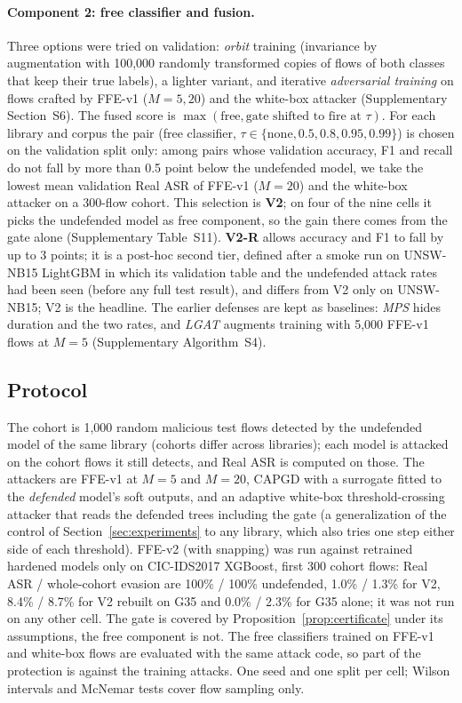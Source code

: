 \paragraph{Component 2: free classifier and fusion.} Three options were tried on validation: \emph{orbit} training (invariance by augmentation with 100,000 randomly transformed copies of flows of both classes that keep their true labels), a lighter variant, and iterative \emph{adversarial training} on flows crafted by FFE-v1 ($M=5,20$) and the white-box attacker (Supplementary Section~S6). The fused score is $\max(\text{free},\text{gate shifted to fire at }\tau)$. For each library and corpus the pair (free classifier, $\tau\in\{\text{none},0.5,0.8,0.95,0.99\}$) is chosen on the validation split only: among pairs whose validation accuracy, F1 and recall do not fall by more than 0.5 point below the undefended model, we take the lowest mean validation Real ASR of FFE-v1 ($M=20$) and the white-box attacker on a 300-flow cohort. This selection is \textbf{V2}; on four of the nine cells it picks the undefended model as free component, so the gain there comes from the gate alone (Supplementary Table~S11). \textbf{V2-R} allows accuracy and F1 to fall by up to 3 points; it is a post-hoc second tier, defined after a smoke run on UNSW-NB15 LightGBM in which its validation table and the undefended attack rates had been seen (before any full test result), and differs from V2 only on UNSW-NB15; V2 is the headline. The earlier defenses are kept as baselines: \emph{MPS} hides duration and the two rates, and \emph{LGAT} augments training with 5,000 FFE-v1 flows at $M=5$ (Supplementary Algorithm~S4).

\subsection{Protocol}

The cohort is 1,000 random malicious test flows detected by the undefended model of the same library (cohorts differ across libraries); each model is attacked on the cohort flows it still detects, and Real ASR is computed on those. The attackers are FFE-v1 at $M=5$ and $M=20$, CAPGD with a surrogate fitted to the \emph{defended} model's soft outputs, and an adaptive white-box threshold-crossing attacker that reads the defended trees including the gate (a generalization of the control of Section~\ref{sec:experiments} to any library, which also tries one step either side of each threshold). FFE-v2 (with snapping) was run against retrained hardened models only on CIC-IDS2017 XGBoost, first 300 cohort flows: Real ASR / whole-cohort evasion are 100\% / 100\% undefended, 1.0\% / 1.3\% for V2, 8.4\% / 8.7\% for V2 rebuilt on G35 and 0.0\% / 2.3\% for G35 alone; it was not run on any other cell. The gate is covered by Proposition~\ref{prop:certificate} under its assumptions, the free component is not. The free classifiers trained on FFE-v1 and white-box flows are evaluated with the same attack code, so part of the protection is against the training attacks. One seed and one split per cell; Wilson intervals and McNemar tests cover flow sampling only.

